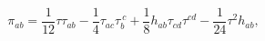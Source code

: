 \begin{equation}
\pi_{ab} = \frac{1}{12} \tau \tau_{ab} - \frac{1}{4} 
\tau_{ac}\tau_{b}^{~c} + \frac{1}{8} h_{ab}\tau_{cd}\tau^{cd}
- \frac{1}{24} \tau^2 h_{ab},
\end{equation}

